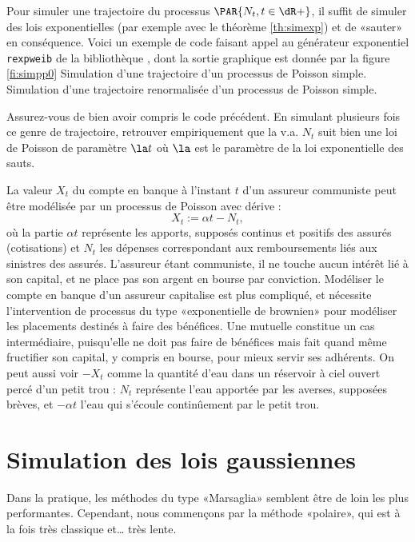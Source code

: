 Pour simuler une trajectoire du processus $\PAR{N_t,t\in\dR+}$, il suffit de
simuler des lois exponentielles (par exemple avec le théorème \ref{th:simexp})
et de «sauter» en conséquence. Voici un exemple de code \ML{} faisant appel au
générateur exponentiel \texttt{rexpweib} de la bibliothèque \SB{}, dont la
sortie graphique est donnée par la figure \ref{fi:simpp0}
%
%
    {Simulation d'une trajectoire d'un processus de Poisson simple.}
%
    {Simulation d'une trajectoire renormalisée d'un processus de Poisson simple.}
%
\begin{exo}
  Assurez-vous de bien avoir compris le code précédent.  En simulant plusieurs
  fois ce genre de trajectoire, retrouver empiriquement que la v.a. $N_t$ suit
  bien une loi de Poisson de paramètre $\la t$ où $\la$ est le paramètre de la
  loi exponentielle des sauts.
\end{exo}

\begin{rem}
La valeur $X_t$ du compte en banque à l'instant $t$ d'un assureur communiste peut être 
modélisée par un processus de Poisson avec dérive :
$$
X_t:=\alpha t - N_t,
$$
où la partie $\alpha t$ représente les apports, supposés continus et positifs
des assurés (cotisations) et $N_t$ les dépenses correspondant aux
remboursements liés aux sinistres des assurés. L'assureur étant communiste, il
ne touche aucun intérêt lié à son capital, et ne place pas son argent en
bourse par conviction.  Modéliser le compte en banque d'un assureur capitalise
est plus compliqué, et nécessite l'intervention de processus du type
«exponentielle de brownien» pour modéliser les placements destinés à faire des
bénéfices.  Une mutuelle constitue un cas intermédiaire, puisqu'elle ne doit
pas faire de bénéfices mais fait quand même fructifier son capital, y compris
en bourse, pour mieux servir ses adhérents.  On peut aussi voir $-X_t$ comme
la quantité d'eau dans un réservoir à ciel ouvert percé d'un petit trou :
$N_t$ représente l'eau apportée par les averses, supposées brèves, et $-\alpha t$
l'eau qui s'écoule continûement par le petit trou.
\end{rem}

%
\section{Simulation des lois gaussiennes}
\label{ss:simu-gauss}
%

Dans la pratique, les méthodes du type «Marsaglia» semblent être de loin les
plus performantes. Cependant, nous commençons par la méthode «polaire», qui
est à la fois très classique et\ldots{} très lente.

